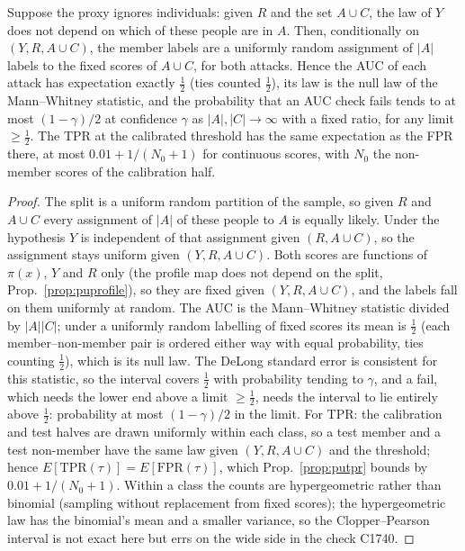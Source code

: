 \begin{proposition}\label{prop:qcnull}
Suppose the proxy ignores individuals: given $R$ and the set $A\cup C$, the law of $Y$ does not depend on which of
these people are in $A$. Then, conditionally on $(Y,R,A\cup C)$, the member labels are a uniformly random assignment of
$|A|$ labels to the fixed scores of $A\cup C$, for both attacks. Hence the AUC of each attack has expectation exactly
$\tfrac12$ (ties counted $\tfrac12$), its law is the null law of the Mann--Whitney statistic, and the probability that
an AUC check fails tends to at most $(1-\gamma)/2$ at confidence $\gamma$ as $|A|,|C|\to\infty$ with a fixed ratio,
for any limit $\ge\tfrac12$. The TPR at the calibrated threshold has the same expectation as the FPR there, at most
$0.01+1/(N_0+1)$ for continuous scores, with $N_0$ the non-member scores of the calibration half.
\end{proposition}
\begin{proof}
The split is a uniform random partition of the sample, so given $R$ and $A\cup C$ every assignment of $|A|$ of these
people to $A$ is equally likely. Under the hypothesis $Y$ is independent of that assignment given $(R,A\cup C)$, so the
assignment stays uniform given $(Y,R,A\cup C)$. Both scores are functions of $\pi(x)$, $Y$ and $R$ only (the profile map
does not depend on the split, Prop.~\ref{prop:puprofile}), so they are fixed given $(Y,R,A\cup C)$, and the labels fall on
them uniformly at random. The AUC is the Mann--Whitney statistic divided by $|A||C|$; under a uniformly random labelling
of fixed scores its mean is $\tfrac12$ (each member--non-member pair is ordered either way with equal probability, ties
counting $\tfrac12$), which is its null law. The DeLong standard error is consistent for this statistic, so the interval
covers $\tfrac12$ with probability tending to $\gamma$, and a fail, which needs the lower end above a limit
$\ge\tfrac12$, needs the interval to lie entirely above $\tfrac12$: probability at most $(1-\gamma)/2$ in the limit.
For TPR: the calibration and test halves are drawn uniformly within each class, so a test member and a test
non-member have the same law given $(Y,R,A\cup C)$ and the threshold; hence $E[\mathrm{TPR}(\tau)]=E[\mathrm{FPR}(\tau)]$,
which Prop.~\ref{prop:putpr} bounds by $0.01+1/(N_0+1)$. Within a class the counts are hypergeometric rather than
binomial (sampling without replacement from fixed scores); the hypergeometric law has the binomial's mean and a
smaller variance, so the Clopper--Pearson interval is not exact here but errs on the wide side in the check C1740.
\end{proof}
